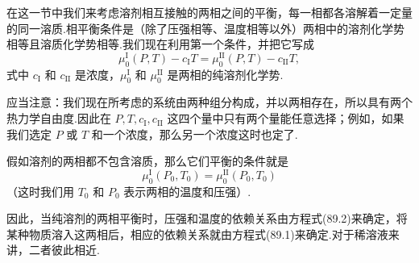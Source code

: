 在这一节中我们来考虑溶剂相互接触的两相之间的平衡，每一相都各溶解着一定量的同一溶质.相平衡条件是（除了压强相等、温度相等以外）两相中的溶剂化学势相等且溶质化学势相等.我们现在利用第一个条件，并把它写成
\begin{equation}
  \mu_0^{\mathrm{I}}(P,T)-c_{\mathrm{I}}T
  =\mu_0^{\mathrm{II}}(P,T)-c_{\mathrm{II}}T,
\end{equation}
式中 $c_{\mathrm{I}}$ 和 $c_{\mathrm{II}}$ 是浓度，$\mu_0^{\mathrm{I}}$ 和 $\mu_0^{\mathrm{II}}$ 是两相的纯溶剂化学势.

应当注意：我们现在所考虑的系统由两种组分构成，并以两相存在，所以具有两个热力学自由度.因此在 $P,T,c_{\mathrm{I}},c_{\mathrm{II}}$ 这四个量中只有两个量能任意选择；例如，如果我们选定 $P$ 或 $T$ 和一个浓度，那么另一个浓度这时也定了.

假如溶剂的两相都不包含溶质，那么它们平衡的条件就是
\begin{equation}
  \mu_0^{\mathrm{I}}(P_0,T_0)=\mu_0^{\mathrm{II}}(P_0,T_0)
\end{equation}
（这时我们用 $T_0$ 和 $P_0$ 表示两相的温度和压强）.

因此，当纯溶剂的两相平衡时，压强和温度的依赖关系由方程式(89.2)来确定，将某种物质溶入这两相后，相应的依赖关系就由方程式(89.1)来确定.对于稀溶液来讲，二者彼此相近.

